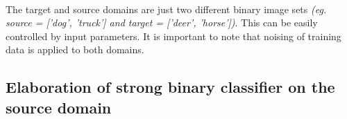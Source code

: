 \documentclass[11 pt]{article}
\begin{document}
\paragraph{}The target and source domains are just two different binary image sets \textit{(eg. source = ['dog', 'truck'] and target = ['deer', 'horse'])}. This can be easily controlled by input parameters. It is important to note that noising of training data is applied to both domains.

\subsection{Elaboration of strong binary classifier on the source domain}

\end{document}
